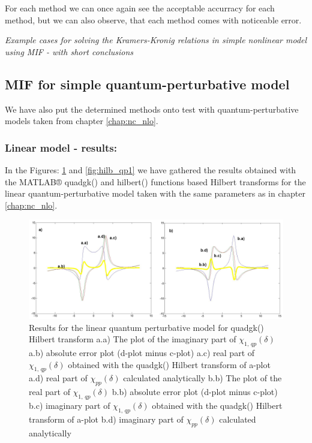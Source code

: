 \documentclass[12pt,twoside,a4paper]{article}
\numberwithin{equation}{subsection}
\numberwithin{figure}{subsection}
\begin{document}
For each method we can once again see the acceptable accurracy for each method, but we can also observe, that each method comes
with noticeable error.

\textit{Example cases for solving the Kramers-Kronig relations in simple nonlinear model using MIF - with short conclusions}

\subsection{MIF for simple quantum-perturbative model} \label{chap:matlab_quantum}

We have also put the determined methods onto test with quantum-perturbative models taken from chapter \ref{chap:nc_nlo}.

\subsubsection*{Linear model - results:}

In the Figures: \ref{fig:quadgk_qp1} and \ref{fig:hilb_qp1} we have gathered the results obtained with the MATLAB® quadgk() and
hilbert() functions based Hilbert transforms for the linear quantum-perturbative model taken with the same parameters as in chapter
\ref{chap:nc_nlo}.

\begin{figure}
  \includegraphics[width=150mm]{img/quadgk_qp1.png}
  \caption{Results for the linear quantum perturbative model for quadgk() Hilbert transform
    a.a) The plot of the imaginary part of ${\chi_{1, \,qp}}(\delta )$
    a.b) absolute error plot (d-plot minus c-plot) 
    a.c) real part of ${\chi_{1, \,qp}}(\delta )$ obtained with the quadgk() Hilbert transform of a-plot 
    a.d) real part of ${\chi_{pp}}(\delta )$ calculated analytically 
    b.b) The plot of the real part of ${\chi_{1, \,qp}}(\delta )$ 
    b.b) absolute error plot (d-plot minus c-plot) 
    b.c) imaginary part of ${\chi_{1, \,qp}}(\delta )$ obtained with the quadgk()  Hilbert transform of a-plot 
    b.d) imaginary part of ${\chi_{pp}}(\delta )$ calculated analytically  
    \label{fig:quadgk_qp1}
  }
\end{figure}
\end{document}
